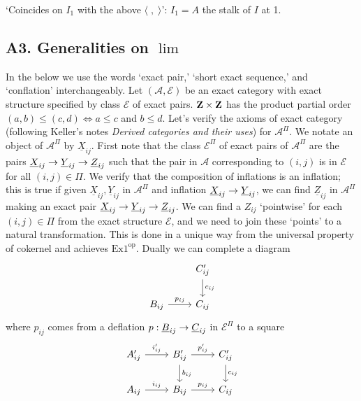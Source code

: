 \documentclass[deligne.tex]{subfiles}
\begin{document}
`Coincides on $I_1$ with the above $\langle\;,\;\rangle$': $I_1=A$ the stalk
of $I$ at 1.

\subsection*{A3. Generalities on $\lim$}\label{glue:A3}
In the below we use the words `exact pair,' `short exact sequence,' and
`conflation' interchangeably. Let $(\mathcal A,\mathcal E)$ be an exact 
category with exact structure specified by class $\mathcal E$ of exact 
pairs. $\mathbf{Z}\times\mathbf{Z}$ has the product partial order
$(a,b)\leq(c,d)\Leftrightarrow a\leq c$ and $b\leq d$.
Let's verify the axioms of exact category (following Keller's notes
\emph{Derived categories and their uses}) for $\mathcal A^\Pi$.
We notate an object of $\mathcal A^\Pi$ by $\underline X_{ij}$.
First note that the class $\mathcal E^\Pi$ of exact pairs of
$\mathcal A^\Pi$ are the pairs
$\underline X_{ij}\rightarrow\underline Y_{ij}\rightarrow\underline Z_{ij}$ such that
the pair in $\mathcal A$ corresponding to $(i,j)$ is in $\mathcal E$ for all
$(i,j)\in\Pi$. We verify that the composition of inflations is an inflation;
this is true if given $\underline X_{ij},\underline Y_{ij}$ in
$\mathcal A^\Pi$ and inflation $\underline X_{ij}\rightarrow\underline Y_{ij}$, we
can find $\underline Z_{ij}$ in $\mathcal A^\Pi$ making an exact pair
$\underline X_{ij}\rightarrow\underline Y_{ij}\rightarrow\underline Z_{ij}$. We can find
a $Z_{ij}$ `pointwise' for each $(i,j)\in\Pi$ from the exact structure
$\mathcal E$, and we need to join these `points' to a natural
transformation. This is done in a unique way from the universal property of
cokernel and achieves $\text{Ex1}^{\text{op}}$.
Dually we can complete a diagram
\begin{equation*}\begin{tikzcd}
	&C'_{ij}\arrow[d,"c_{ij}"] \\
	B_{ij}\arrow[r,"p_{ij}"]&C_{ij}
\end{tikzcd}\end{equation*}
where $p_{ij}$ comes from a deflation
$p:\underline B_{ij}\rightarrow\underline C_{ij}$
in $\mathcal E^\Pi$ to a square
\begin{equation*}\begin{tikzcd}
	A'_{ij}\arrow[r,"i'_{ij}"]&B'_{ij}\arrow[d,"b_{ij}"]\arrow[r,"p'_{ij}"]&C'_{ij}\arrow[d,"c_{ij}"] \\
	A_{ij}\arrow[r,"i_{ij}"]&B_{ij}\arrow[r,"p_{ij}"]&C_{ij}
\end{tikzcd}\end{equation*}
\end{document}
